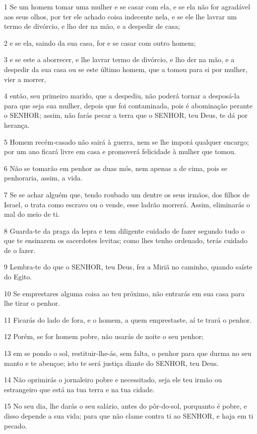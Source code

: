 \par 1 Se um homem tomar uma mulher e se casar com ela, e se ela não for agradável aos seus olhos, por ter ele achado coisa indecente nela, e se ele lhe lavrar um termo de divórcio, e lho der na mão, e a despedir de casa;
\par 2 e se ela, saindo da sua casa, for e se casar com outro homem;
\par 3 e se este a aborrecer, e lhe lavrar termo de divórcio, e lho der na mão, e a despedir da sua casa ou se este último homem, que a tomou para si por mulher, vier a morrer,
\par 4 então, seu primeiro marido, que a despediu, não poderá tornar a desposá-la para que seja sua mulher, depois que foi contaminada, pois é abominação perante o SENHOR; assim, não farás pecar a terra que o SENHOR, teu Deus, te dá por herança.
\par 5 Homem recém-casado não sairá à guerra, nem se lhe imporá qualquer encargo; por um ano ficará livre em casa e promoverá felicidade à mulher que tomou.
\par 6 Não se tomarão em penhor as duas mós, nem apenas a de cima, pois se penhoraria, assim, a vida.
\par 7 Se se achar alguém que, tendo roubado um dentre os seus irmãos, dos filhos de Israel, o trata como escravo ou o vende, esse ladrão morrerá. Assim, eliminarás o mal do meio de ti.
\par 8 Guarda-te da praga da lepra e tem diligente cuidado de fazer segundo tudo o que te ensinarem os sacerdotes levitas; como lhes tenho ordenado, terás cuidado de o fazer.
\par 9 Lembra-te do que o SENHOR, teu Deus, fez a Miriã no caminho, quando saíste do Egito.
\par 10 Se emprestares alguma coisa ao teu próximo, não entrarás em sua casa para lhe tirar o penhor.
\par 11 Ficarás do lado de fora, e o homem, a quem emprestaste, aí te trará o penhor.
\par 12 Porém, se for homem pobre, não usarás de noite o seu penhor;
\par 13 em se pondo o sol, restituir-lhe-ás, sem falta, o penhor para que durma no seu manto e te abençoe; isto te será justiça diante do SENHOR, teu Deus.
\par 14 Não oprimirás o jornaleiro pobre e necessitado, seja ele teu irmão ou estrangeiro que está na tua terra e na tua cidade.
\par 15 No seu dia, lhe darás o seu salário, antes do pôr-do-sol, porquanto é pobre, e disso depende a sua vida; para que não clame contra ti ao SENHOR, e haja em ti pecado.
